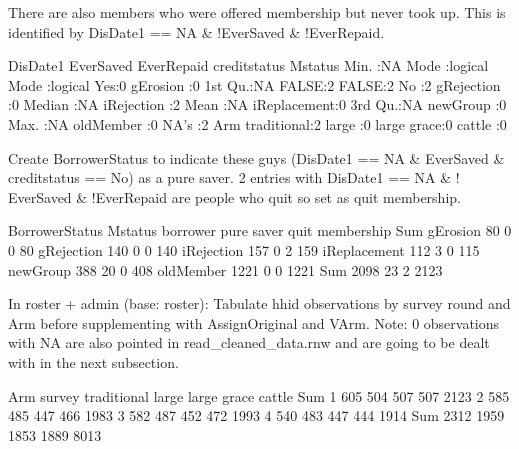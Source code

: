 There are also members who were offered membership but never took up. This is identified by \textsf{DisDate1} == NA \& \textsf{$!$EverSaved}  \& \textsf{$!$EverRepaid}. 
\begin{Schunk}
\begin{Soutput}
    DisDate1  EverSaved       EverRepaid      creditstatus         Mstatus 
 Min.   :NA   Mode :logical   Mode :logical   Yes:0        gErosion    :0  
 1st Qu.:NA   FALSE:2         FALSE:2         No :2        gRejection  :0  
 Median :NA                                                iRejection  :2  
 Mean   :NA                                                iReplacement:0  
 3rd Qu.:NA                                                newGroup    :0  
 Max.   :NA                                                oldMember   :0  
 NA's   :2                                                                 
          Arm   
 traditional:2  
 large      :0  
 large grace:0  
 cattle     :0  
                
                
                
\end{Soutput}
\end{Schunk}
Create \textsf{BorrowerStatus} to indicate these guys (\textsf{DisDate1} == NA \& \textsf{EverSaved} \& \textsf{creditstatus} == No) as a \textsf{pure saver}. 2 entries with \textsf{DisDate1} == NA \& \textsf{$!$EverSaved}  \& \textsf{$!$EverRepaid} are people who quit so set as \textsf{quit membership}. \gobblepars
\begin{Schunk}
\begin{Soutput}
              BorrowerStatus
Mstatus        borrower pure saver quit membership  Sum
  gErosion           80          0               0   80
  gRejection        140          0               0  140
  iRejection        157          0               2  159
  iReplacement      112          3               0  115
  newGroup          388         20               0  408
  oldMember        1221          0               0 1221
  Sum              2098         23               2 2123
\end{Soutput}
\end{Schunk}
In \textsf{roster + admin} (base: roster): Tabulate \textsf{hhid} observations by \textsf{survey} round and \textsf{Arm} before supplementing with \textsf{AssignOriginal} and \textsf{VArm}. Note: 0 observations with NA are also pointed in \textsf{read\_cleaned\_data.rnw} and are going to be dealt with in the next subsection.
\begin{Schunk}
\begin{Soutput}
      Arm
survey traditional large large grace cattle  Sum
   1           605   504         507    507 2123
   2           585   485         447    466 1983
   3           582   487         452    472 1993
   4           540   483         447    444 1914
   Sum        2312  1959        1853   1889 8013
\end{Soutput}
\end{Schunk}

